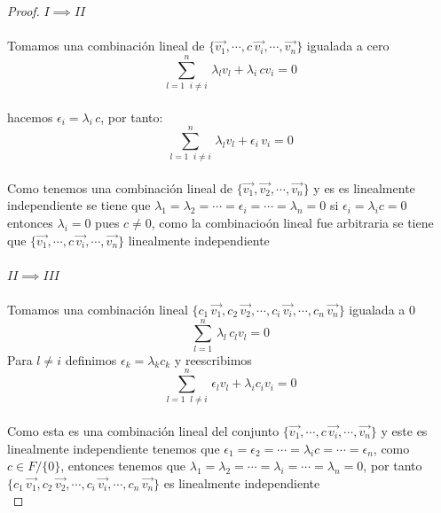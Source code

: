 \documentclass[11pt,letterpaper]{article}
\begin{document}
\begin{proof}
$I\implies II$\,\\
\,\\
Tomamos una combinaci\'on lineal de $\{\vec{v_1},\cdots,c\,\vec{v_i},\cdots,\vec{v_n}\}$ igualada a cero\,\\
\begin{equation*}
    \sum_{l=1\,\,\:i\neq i}^{n}\,\lambda_l v_l+\lambda_i\,cv_i=0
\end{equation*}\,\\
hacemos $\epsilon_i=\lambda_i\,c$, por tanto:\,\\
\begin{equation*}
    \sum_{l=1\,\,\:i\neq i}^{n}\,\lambda_l v_l+\epsilon_i\,v_i=0
\end{equation*}\,\\
Como tenemos una combinaci\'on lineal de $\{\vec{v_1},\vec{v_2},\cdots, \vec{v_n}\}$ y es es linealmente independiente se tiene que $\lambda_1=\lambda_2=\cdots=\epsilon_i=\cdots=\lambda_n=0$
si $\epsilon_i=\lambda_ic=0$ entonces $\lambda_i=0$ pues $c\neq 0$, como la combinacio\'on lineal fue arbitraria se tiene que  $\{\vec{v_1},\cdots,c\,\vec{v_i},\cdots,\vec{v_n}\}$ linealmente independiente\,\\
\,\\
$II\implies III$\,\\
\,\\
Tomamos una combinaci\'on lineal $\{c_1\,\vec{v_1},c_2\,\vec{v_2},\cdots,c_i\,\vec{v_i},\cdots,c_n\,\vec{v_n}\}$ igualada a 0\,\\
    \begin{equation*}
        \sum_{l=1}^{n}\,\lambda_l\,c_lv_l=0
    \end{equation*}
    Para $l\neq i$ definimos $\epsilon_k=\lambda_kc_k$ y reescribimos\,\\
    \begin{equation*}
        \sum_{l=1\,\,\:l\neq i}^{n}\,\epsilon_lv_l+\lambda_ic_iv_i=0
    \end{equation*}\,\\
    Como esta es una combinaci\'on lineal del conjunto $\{\vec{v_1},\cdots,c\,\vec{v_i},\cdots,\vec{v_n}\}$ y este es linealmente independiente tenemos que 
    $\epsilon_1=\epsilon_2=\cdots=\lambda_ic=\cdots=\epsilon_n$, como $c\in F/\{0\}$, entonces tenemos que $\lambda_1=\lambda_2=\cdots=\lambda_i=\cdots=\lambda_n=0$, por tanto
    $\{c_1\,\vec{v_1},c_2\,\vec{v_2},\cdots,c_i\,\vec{v_i},\cdots,c_n\,\vec{v_n}\}$ es linealmente independiente\,\\

\end{proof}
\end{document}
